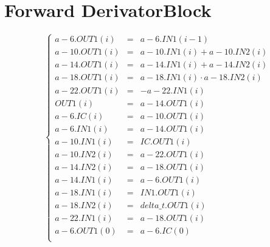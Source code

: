 \documentclass{article}
\begin{document}
\section{Forward DerivatorBlock}
$$
\left\{\begin{array}{lcl}
	a-6.OUT1(i) &=& a-6.IN1\left(i-1\right)\\
	a-10.OUT1(i) &=& a-10.IN1\left(i\right) + a-10.IN2\left(i\right)\\
	a-14.OUT1(i) &=& a-14.IN1\left(i\right) + a-14.IN2\left(i\right)\\
	a-18.OUT1(i) &=& a-18.IN1\left(i\right) \cdot  a-18.IN2\left(i\right)\\
	a-22.OUT1(i) &=& -a-22.IN1\left(i\right)\\
	OUT1(i) &=& a-14.OUT1\left(i\right)\\
	a-6.IC(i) &=& a-10.OUT1\left(i\right)\\
	a-6.IN1(i) &=& a-14.OUT1\left(i\right)\\
	a-10.IN1(i) &=& IC.OUT1\left(i\right)\\
	a-10.IN2(i) &=& a-22.OUT1\left(i\right)\\
	a-14.IN2(i) &=& a-18.OUT1\left(i\right)\\
	a-14.IN1(i) &=& a-6.OUT1\left(i\right)\\
	a-18.IN1(i) &=& IN1.OUT1\left(i\right)\\
	a-18.IN2(i) &=& delta\_t.OUT1\left(i\right)\\
	a-22.IN1(i) &=& a-18.OUT1\left(i\right)\\
	a-6.OUT1(0) &=& a-6.IC(0)\\
\end{array}\right.
$$
\end{document}
